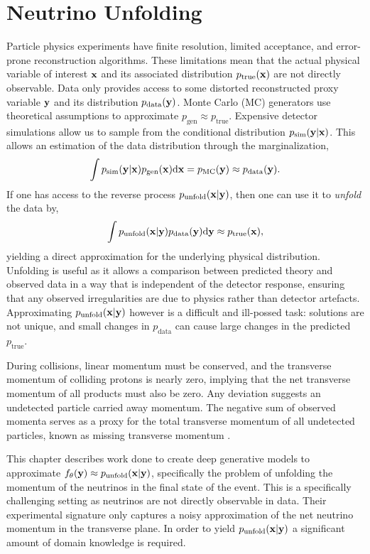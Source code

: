 \chapter{Neutrino Unfolding}
\label{ch:neutrino_unfolding}

Particle physics experiments have finite resolution, limited acceptance, and error-prone reconstruction algorithms.
These limitations mean that the actual physical variable of interest $\mathbf{x}$ and its associated distribution $p_\text{true}(\mathbf{x})$ are not directly observable.
Data only provides access to some distorted reconstructed proxy variable $\mathbf{y}$ and its distribution $p_\text{data}(\mathbf{y})$.
Monte Carlo (MC) generators use theoretical assumptions to approximate $p_\text{gen} \approx p_\text{true}$.
Expensive detector simulations allow us to sample from the conditional distribution $p_\text{sim}(\mathbf{y}|\mathbf{x})$.
This allows an estimation of the data distribution through the marginalization,
\begin{equation}
    \int p_\text{sim}(\mathbf{y}|\mathbf{x}) p_\text{gen}(\mathbf{x}) \mathrm{d}\mathbf{x} = p_\text{MC}(\mathbf{y}) \approx p_\text{data}(\mathbf{y}).
\end{equation}
If one has access to the reverse process $p_\text{unfold}(\mathbf{x}|\mathbf{y})$, then one can use it to \textit{unfold} the data by,
\begin{equation}
    \int p_\text{unfold}(\mathbf{x}|\mathbf{y}) p_\text{data}(\mathbf{y}) \mathrm{d}\mathbf{y} \approx p_\text{true}(\mathbf{x}),
\end{equation}
yielding a direct approximation for the underlying physical distribution.
Unfolding is useful as it allows a comparison between predicted theory and observed data in a way that is independent of the detector response, ensuring that any observed irregularities are due to physics rather than detector artefacts.
Approximating $p_\text{unfold}(\mathbf{x}|\mathbf{y})$ however is a difficult and ill-possed task: solutions are not unique, and small changes in $p_\text{data}$ can cause large changes in the predicted $p_\text{true}$.

During collisions, linear momentum must be conserved, and the transverse momentum of colliding protons is nearly zero, implying that the net transverse momentum of all products must also be zero.
Any deviation suggests an undetected particle carried away momentum.
The negative sum of observed momenta serves as a proxy for the total transverse momentum of all undetected particles, known as missing transverse momentum \ptmiss.

This chapter describes work done to create deep generative models to approximate $f_\theta(\mathbf{y}) \approx p_\text{unfold}(\mathbf{x}|\mathbf{y})$, specifically the problem of unfolding the momentum of the neutrinos in the final state of the event.
This is a specifically challenging setting as neutrinos are not directly observable in data.
Their experimental signature \ptmiss only captures a noisy approximation of the net neutrino momentum in the transverse plane.
In order to yield $p_\text{unfold}(\mathbf{x}|\mathbf{y})$ a significant amount of domain knowledge is required.

